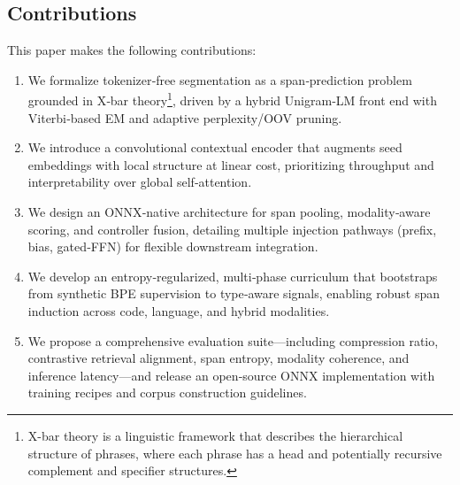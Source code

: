 \subsection{Contributions}

This paper makes the following contributions:
\begin{enumerate}
	\item We formalize tokenizer‐free segmentation as a span‐prediction problem grounded in X‐bar theory\footnote{X-bar theory is a linguistic framework that describes the hierarchical structure of phrases, where each phrase has a head and potentially recursive complement and specifier structures.}, driven by a hybrid Unigram‐LM front end with Viterbi‐based EM and adaptive perplexity/OOV pruning.
	\item We introduce a convolutional contextual encoder that augments seed embeddings with local structure at linear cost, prioritizing throughput and interpretability over global self‐attention.
	\item We design an ONNX‐native architecture for span pooling, modality‐aware scoring, and controller fusion, detailing multiple injection pathways (prefix, bias, gated‐FFN) for flexible downstream integration.
	\item We develop an entropy‐regularized, multi‐phase curriculum that bootstraps from synthetic BPE supervision to type‐aware signals, enabling robust span induction across code, language, and hybrid modalities.
	\item We propose a comprehensive evaluation suite—including compression ratio, contrastive retrieval alignment, span entropy, modality coherence, and inference latency—and release an open‐source ONNX implementation with training recipes and corpus construction guidelines.
\end{enumerate}